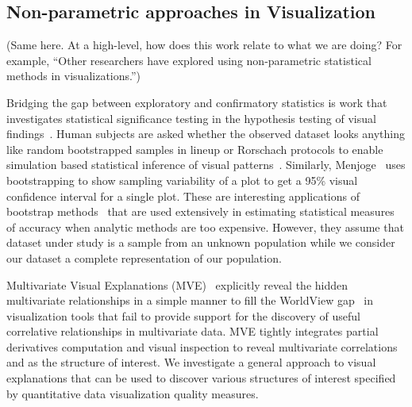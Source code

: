 \subsection{Non-parametric approaches in Visualization}
(Same here. At a high-level, how does this work relate to what we are doing? For example, ``Other researchers have explored using non-parametric statistical methods in visualizations.'')

Bridging the gap between exploratory and confirmatory statistics is work that investigates statistical significance testing in the hypothesis testing of visual findings~\cite{Wickham2013, Majumder2013}. Human subjects are asked whether the observed dataset looks anything like random bootstrapped samples in lineup or Rorschach protocols to enable simulation based statistical inference of visual patterns~\cite{Buja2009}. Similarly, Menjoge~\cite{Menjoge2010} uses bootstrapping to show sampling variability of a plot to get a 95\% visual confidence interval for a single plot. These are interesting applications of bootstrap methods~\cite{Efron1979} that are used extensively in estimating statistical measures of accuracy when analytic methods are too expensive. However, they assume that dataset under study is a sample from an unknown population while we consider our dataset a complete representation of our population.

Multivariate Visual Explanations (MVE)~\cite{Barlowe2008} explicitly reveal the hidden multivariate relationships in a simple manner to fill the WorldView gap~\cite{Amar2004} in visualization tools that fail to provide support for the discovery of useful correlative relationships in multivariate data. MVE tightly integrates partial derivatives computation and visual inspection to reveal multivariate correlations and as the structure of interest. We investigate a general approach to visual explanations that can be used to discover various structures of interest specified by quantitative data visualization quality measures.

